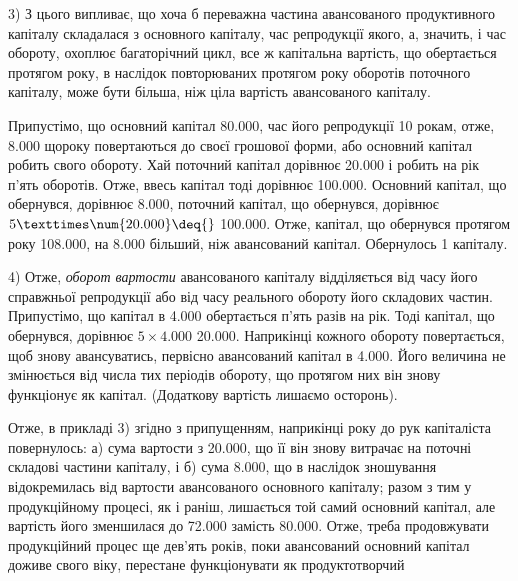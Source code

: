 
3) З цього випливає, що хоча б переважна частина авансованого
продуктивного капіталу складалася з основного капіталу, час репродукції
якого, а, значить, і час обороту, охоплює багаторічний цикл, все ж капітальна
вартість, що обертається протягом року, в наслідок повторюваних
протягом року оборотів поточного капіталу, може бути більша, ніж ціла
вартість авансованого капіталу.

Припустімо, що основний капітал \deq{} \num{80.000}, час його репродукції
\deq{} 10 рокам, отже, \num{8.000} щороку повертаються до своєї
грошової форми, або основний капітал робить  свого обороту. Хай
поточний капітал дорівнює \num{20.000} і робить на рік п’ять оборотів.
Отже, ввесь капітал тоді дорівнює \num{100.000}. Основний
капітал, що обернувся, дорівнює \num{8.000}, поточний капітал, що
обернувся, дорівнює $5 × \num{20.000} \deq{}$ \num{100.000}. Отже, капітал, що
обернувся протягом року \deq{} \num{108.000}, на \num{8.000} більший,
ніж авансований капітал. Обернулось 1 \dplus{}  капіталу.

4) Отже, \emph{оборот вартости} авансованого капіталу відділяється
від часу його справжньої репродукції або від часу реального обороту
його складових частин. Припустімо, що капітал в \num{4.000} обертається
п’ять разів на рік. Тоді капітал, що обернувся, дорівнює
$5 × \num{4.000}$ \deq{} \num{20.000}. Наприкінці кожного обороту повертається,
щоб знову авансуватись, первісно авансований капітал в \num{4.000}.
Його величина не змінюється від числа тих періодів обороту, що
протягом них він знову функціонує як капітал. (Додаткову вартість
лишаємо осторонь).

Отже, в прикладі 3) згідно з припущенням, наприкінці року до рук
капіталіста повернулось: а) сума вартости з \num{20.000}, що її він
знову витрачає на поточні складові частини капіталу, і б) сума \num{8.000}, що в наслідок зношування відокремилась від вартости авансованого
основного капіталу; разом з тим у продукційному процесі, як і
раніш, лишається той самий основний капітал, але вартість його
зменшилася до \num{72.000} замість \num{80.000}. Отже, треба продовжувати
продукційний процес ще дев’ять років, поки авансований основний
капітал доживе свого віку, перестане функціонувати як продуктотворчий
\parbreak{}  %
